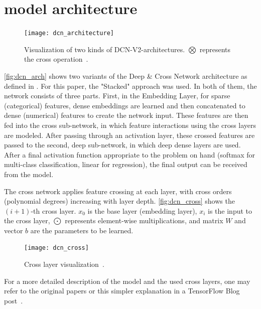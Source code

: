 \documentclass[10pt,final,journal,a4paper,oneside,twocolumn]{IEEEtran}
\begin{document}
\section{model architecture}\label{sec:model_arch}

\begin{figure}[ht]
    \centering
    \texttt{[image: dcn\_architecture]}
    \caption{Visualization of two kinds of DCN-V2-architectures. $ \bigotimes $ represents the cross operation~\cite{Wang.2021}.}
    \label{fig:dcn_arch}
\end{figure}

\autoref{fig:dcn_arch} shows two variants of the Deep \& Cross Network architecture as defined in \cite{Wang.2021}. For this paper, the "Stacked" approach was used.
In both of them, the network consists of three parts. First, in the Embedding Layer, for sparse (categorical) features, dense embeddings are learned and then concatenated to dense (numerical) features to create the network input. These features are then fed into the cross sub-network, in which feature interactions using the cross layers are modeled. After passing through an activation layer, these crossed features are passed to the second, deep sub-network, in which deep dense layers are used. After a final activation function appropriate to the problem on hand (softmax for multi-class classification, linear for regression), the final output can be received from the model.

The cross network applies feature crossing at each layer, with cross orders (polynomial degrees) increasing with layer depth. \autoref{fig:dcn_cross} shows the $ (i+1) $-th cross layer.
$ x_{0} $ is the base layer (embedding layer), $ x_{i} $  is the input to the cross layer, $ \bigodot $ represents element-wise multiplications, and matrix $ W $ and vector $ b $ are the parameters to be learned.

\begin{figure}[ht]
    \centering
    \texttt{[image: dcn\_cross]}
    \caption{Cross layer visualization~\cite{Wang.2021}.}
    \label{fig:dcn_cross}
\end{figure}

For a more detailed description of the model and the used cross layers, one may refer to the original papers or this simpler explanation in a TensorFlow Blog post~\cite{Wang.2020}.
\end{document}

